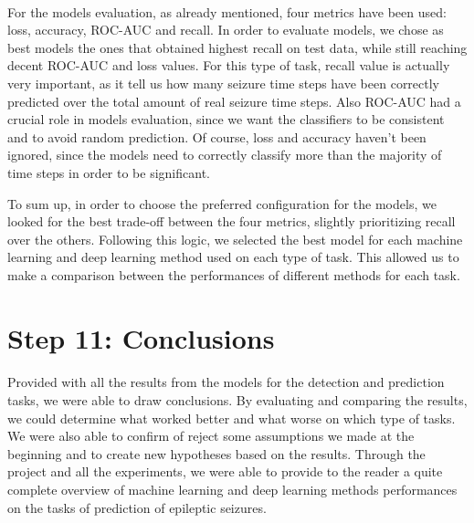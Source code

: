 \paragraph{} For the models evaluation, as already mentioned, four metrics have been used: loss, accuracy, ROC-AUC and recall. In order to evaluate models, we chose as best models the ones that obtained highest recall on test data, while still reaching decent ROC-AUC and loss values. For this type of task, recall value is actually very important, as it tell us how many seizure time steps have been correctly predicted over the total amount of real seizure time steps. Also ROC-AUC had a crucial role in models evaluation, since we want the classifiers to be consistent and to avoid random prediction. Of course, loss and accuracy haven't been ignored, since the models need to correctly classify more than the majority of time steps in order to be significant.

To sum up, in order to choose the preferred configuration for the models, we looked for the best trade-off between the four metrics, slightly prioritizing recall over the others. Following this logic, we selected the best model for each machine learning and deep learning method used on each type of task. This allowed us to make a comparison between the performances of different methods for each task.


\section{Step 11: Conclusions} \label{sec: step_conclusions}
\paragraph{} Provided with all the results from the models for the detection and prediction tasks, we were able to draw conclusions. By evaluating and comparing the results, we could determine what worked better and what worse on which type of tasks. We were also able to confirm of reject some assumptions we made at the beginning and to create new hypotheses based on the results. Through the project and all the experiments, we were able to provide to the reader a quite complete overview of machine learning and deep learning methods performances on the tasks of prediction of epileptic seizures.
